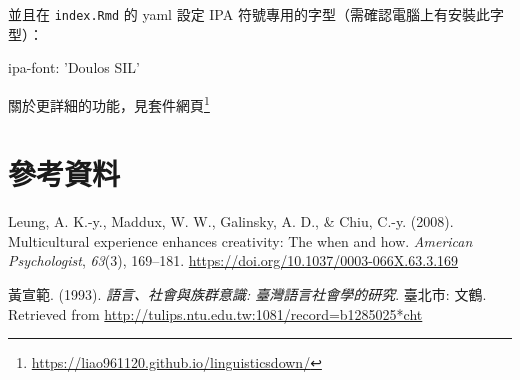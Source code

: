 \documentclass[oneside]{book}
\newenvironment{Shaded}{\begin{snugshade}}{\end{snugshade}}
\newcommand{\StringTok}[1]{\textcolor[rgb]{0.31,0.60,0.02}{#1}}
\newcommand{\FunctionTok}[1]{\textcolor[rgb]{0.00,0.00,0.00}{#1}}
\newcommand{\AttributeTok}[1]{\textcolor[rgb]{0.77,0.63,0.00}{#1}}
\let\oldhref=\href
\renewcommand{\href}[2]{#2\footnote{\url{#1}}}
\begin{document}
並且在 \texttt{index.Rmd} 的 yaml 設定 IPA
符號專用的字型（需確認電腦上有安裝此字型）：

\begin{Shaded}
\begin{Highlighting}[]
\FunctionTok{ipa-font:}\AttributeTok{ }\StringTok{'Doulos SIL'}
\end{Highlighting}
\end{Shaded}

關於更詳細的功能，見\href{https://liao961120.github.io/linguisticsdown/}{套件網頁}

\renewcommand{\href}{\oldhref}

\chapter*{參考資料}\label{references}

\hypertarget{refs}{}
\hypertarget{ref-leung2008}{}
Leung, A. K.-y., Maddux, W. W., Galinsky, A. D., \& Chiu, C.-y. (2008).
Multicultural experience enhances creativity: The when and how.
\emph{American Psychologist}, \emph{63}(3), 169--181.
\url{https://doi.org/10.1037/0003-066X.63.3.169}

\hypertarget{ref-huangxuanfan1993}{}
黃宣範. (1993). \emph{語言、社會與族群意識: 臺灣語言社會學的研究}.
臺北市: 文鶴. Retrieved from
\url{http://tulips.ntu.edu.tw:1081/record=b1285025*cht}
\end{document}
